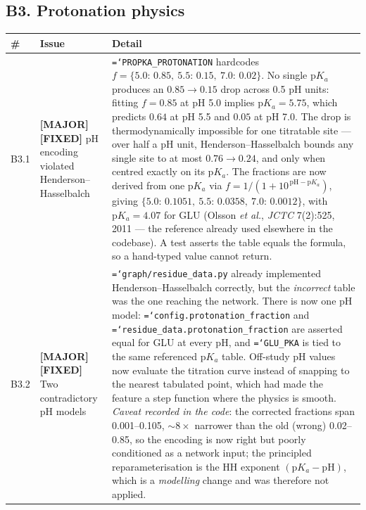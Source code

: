 \documentclass[11pt,a4paper]{article}
\newcommand{\ok}[1]{\textcolor{okgreen}{#1}}
\newcommand{\warn}[1]{\textcolor{warnamber}{#1}}
\newcommand{\code}[1]{\texttt{\small\hyphenchar\font=`\-\relax #1}}
\newcommand{\SMAJOR}{\warn{\textbf{[MAJOR]}}}
\newcommand{\SFIXED}{\ok{\textbf{[FIXED]}}}
\begin{document}
\subsection{B3. Protonation physics}

\begin{longtable}{@{}L{0.6cm}L{5.2cm}L{8.6cm}@{}}
\toprule
\textbf{\#} & \textbf{Issue} & \textbf{Detail} \\
\midrule
\endhead
B3.1 & \SMAJOR{} \SFIXED{} pH encoding violated Henderson--Hasselbalch &
  \code{PROPKA\_PROTONATION} hardcodes $f = \{5.0{:}\,0.85,\ 5.5{:}\,0.15,\
  7.0{:}\,0.02\}$. No single p$K_a$ produces an $0.85 \to 0.15$ drop across
  0.5 pH units: fitting $f=0.85$ at pH 5.0 implies p$K_a = 5.75$, which
  predicts $0.64$ at pH 5.5 and $0.05$ at pH 7.0. The drop is
  thermodynamically impossible for one titratable site --- over half a pH
  unit, Henderson--Hasselbalch bounds any single site to at most
  $0.76 \to 0.24$, and only when centred exactly on its p$K_a$.
  The fractions are now \ok{derived} from one p$K_a$ via
  $f = 1/(1 + 10^{\,\mathrm{pH} - \mathrm{p}K_a})$, giving
  $\{5.0{:}\,0.1051,\ 5.5{:}\,0.0358,\ 7.0{:}\,0.0012\}$, with
  $\mathrm{p}K_a = 4.07$ for GLU (Olsson \emph{et al.}, \emph{JCTC} 7(2):525,
  2011 --- the reference already used elsewhere in the codebase). A test
  asserts the table equals the formula, so a hand-typed value cannot
  return. \\
B3.2 & \SMAJOR{} \SFIXED{} Two contradictory pH models &
  \code{graph/residue\_data.py} already implemented Henderson--Hasselbalch
  correctly, but the \emph{incorrect} table was the one reaching the network.
  There is now \ok{one pH model}: \code{config.protonation\_fraction} and
  \code{residue\_data.protonation\_fraction} are asserted equal for GLU at
  every pH, and \code{GLU\_PKA} is tied to the same referenced p$K_a$ table.
  Off-study pH values now evaluate the titration curve instead of snapping to
  the nearest tabulated point, which had made the feature a step function
  where the physics is smooth. \emph{Caveat recorded in the code}: the
  corrected fractions span 0.001--0.105, ${\sim}8\times$ narrower than the
  old (wrong) 0.02--0.85, so the encoding is now right but poorly conditioned
  as a network input; the principled reparameterisation is the HH exponent
  $(\mathrm{p}K_a - \mathrm{pH})$, which is a \emph{modelling} change and was
  therefore not applied. \\
\bottomrule
\end{longtable}
\end{document}
